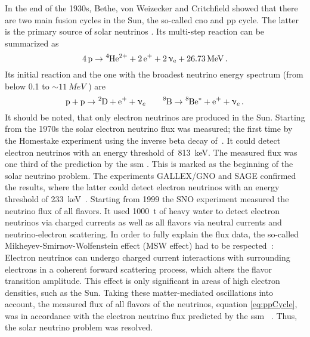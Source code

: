 In the end of the 1930s, Bethe, von Weizecker and Critchfield showed that there are two main fusion cycles in the Sun, the so-called cno and pp cycle. The latter is the primary source of solar neutrinos \cite{Weiz1938, Bethe38, Bethe39}. Its multi-step reaction can be summarized as~\cite{zuber2011neutrino}
\begin{equation}
	\ce{4p} 
	\rightarrow 
	\ce{^4He^{2+}} +
	\ce{2e^+} +
	\ce{2\eneutrino} +
	\SI{26.73}{MeV}
	\fullstop
\end{equation}
Its initial reaction and the one with the broadest neutrino energy spectrum (from below 0.1 to $\sim\SI{11}{MeV}$ \cite{ReviewOfParticlePhysics}) are
\begin{equation}
\ce{p} + \ce{p} \rightarrow \ce{^2D} + \ce{e^+} + \upnu_e
\qquad
\ce{^8B} \rightarrow \ce{^8Be^*} + \ce{e^+} + \upnu_e \fullstop
\label{eq:ppCycle}
\end{equation}
It should be noted, that only electron neutrinos are produced in the Sun. Starting from the 1970s the solar electron neutrino flux was measured; the first time by the Homestake experiment using the inverse beta decay of~. It could detect electron neutrinos with an energy threshold of~\SI{813}{keV}. The measured flux was one third of the prediction by the \gls{ssm} \cite{Cleveland1998, Bahcall2001}. This is marked as the beginning of the solar neutrino problem. The experiments GALLEX/GNO and SAGE confirmed the results, where the latter could detect electron neutrinos with an energy threshold of \SI{233}{keV}~\cite{Kirsten1998, Altmann2005, Abdurashitov2009}. Starting from 1999 the SNO experiment measured the neutrino flux of all flavors. It used \SI{1000}{t} of heavy water  to detect electron neutrinos via charged currents as well as all flavors via neutral currents and neutrino-electron scattering. In order to fully explain the flux data, the so-called Mikheyev-Smirnov-Wolfenstein effect (MSW effect) had to be respected~\cite{Wolfenstein1977, Mikheev1986}: Electron neutrinos can undergo charged current interactions with surrounding electrons in a coherent forward scattering process, which alters the flavor transition amplitude. This effect is only significant in areas of high electron densities, such as the Sun. Taking these matter-mediated oscillations into account, the measured flux of all flavors of the  neutrinos, equation \eqref{eq:ppCycle}, was in accordance with the electron neutrino flux predicted by the \gls{ssm}~ \cite{Aharmim2013}. Thus, the solar neutrino problem was resolved.

